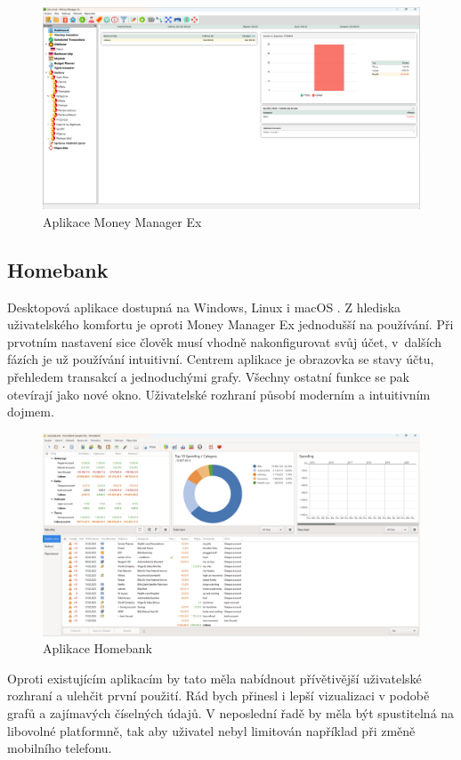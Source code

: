 \documentclass[
  biblatex,
  figures=true,
  tables=false,
  glossaries,
  index
]{kidiplom}
\begin{document}
\begin{figure}
  \centering
  \includegraphics[width=1\textwidth]{images/manager-ex.png}
  \caption{Aplikace Money Manager Ex}
\end{figure}

\subsection{Homebank}
Desktopová aplikace dostupná na Windows, Linux i macOS \cite{homebank}. Z hlediska uživatelského komfortu je oproti Money Manager Ex jednodušší na používání. Při prvotním nastavení sice člověk musí vhodně nakonfigurovat svůj účet, v~dalších fázích je už používání intuitivní. Centrem aplikace je obrazovka se stavy účtu, přehledem transakcí a jednoduchými grafy. Všechny ostatní funkce se pak otevírají jako nové okno. Uživatelské rozhraní působí moderním a intuitivním dojmem.

\begin{figure}
  \centering
  \includegraphics[width=1\textwidth]{images/homebank.png}
  \caption{Aplikace Homebank}
\end{figure}

Oproti existujícím aplikacím by tato měla nabídnout přívětivější uživatelské rozhraní a ulehčit první použití. Rád bych přinesl i lepší vizualizaci v podobě grafů a zajímavých číselných údajů. V neposlední řadě by měla být spustitelná na libovolné platformně, tak aby uživatel nebyl limitován například při změně mobilního telefonu.
\end{document}

